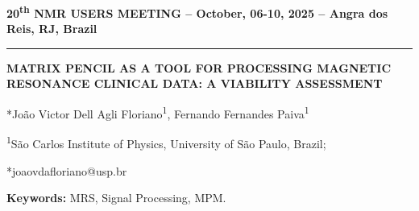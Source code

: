 \documentclass[10pt]{article}
\begin{document}
\centering
\textbf{20\textsuperscript{th} NMR USERS MEETING -- October, 06-10, 2025 -- Angra dos Reis, RJ, Brazil}

\noindent\rule{\textwidth}{0.4pt} %

\vspace{24pt}

\textbf{MATRIX PENCIL AS A TOOL FOR PROCESSING MAGNETIC RESONANCE CLINICAL DATA: A VIABILITY ASSESSMENT}

\vspace{12pt}

*João Victor Dell Agli Floriano\textsuperscript{1}, Fernando Fernandes Paiva\textsuperscript{1}

\vspace{6pt}

\textsuperscript{1}São Carlos Institute of Physics, University of São Paulo, Brazil; 

*joaovdafloriano@usp.br

\vspace{12pt}
\begin{flushleft}
\textbf{Keywords:} MRS, Signal Processing, MPM.
\end{flushleft}
\end{document}
